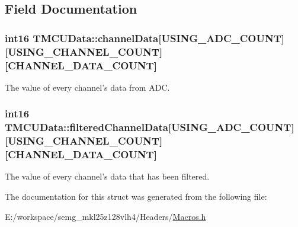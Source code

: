 \subsection{Field Documentation}
\hypertarget{struct_t_m_c_u_data_aef7d4db6ea39953bacce61c20af6a1c5}{
\subsubsection[{channel\-Data}]{\setlength{\rightskip}{0pt plus 5cm}int16 T\-M\-C\-U\-Data\-::channel\-Data\mbox{[}{\bf U\-S\-I\-N\-G\-\_\-\-A\-D\-C\-\_\-\-C\-O\-U\-N\-T}\mbox{]}\mbox{[}{\bf U\-S\-I\-N\-G\-\_\-\-C\-H\-A\-N\-N\-E\-L\-\_\-\-C\-O\-U\-N\-T}\mbox{]}\mbox{[}{\bf C\-H\-A\-N\-N\-E\-L\-\_\-\-D\-A\-T\-A\-\_\-\-C\-O\-U\-N\-T}\mbox{]}}}\label{struct_t_m_c_u_data_aef7d4db6ea39953bacce61c20af6a1c5}
The value of every channel's data from A\-D\-C. \hypertarget{struct_t_m_c_u_data_a1d78433e8986060ae6ca53c035c65619}{
\subsubsection[{filtered\-Channel\-Data}]{\setlength{\rightskip}{0pt plus 5cm}int16 T\-M\-C\-U\-Data\-::filtered\-Channel\-Data\mbox{[}{\bf U\-S\-I\-N\-G\-\_\-\-A\-D\-C\-\_\-\-C\-O\-U\-N\-T}\mbox{]}\mbox{[}{\bf U\-S\-I\-N\-G\-\_\-\-C\-H\-A\-N\-N\-E\-L\-\_\-\-C\-O\-U\-N\-T}\mbox{]}\mbox{[}{\bf C\-H\-A\-N\-N\-E\-L\-\_\-\-D\-A\-T\-A\-\_\-\-C\-O\-U\-N\-T}\mbox{]}}}\label{struct_t_m_c_u_data_a1d78433e8986060ae6ca53c035c65619}
The value of every channel's data that has been filtered. 

The documentation for this struct was generated from the following file\-:\begin{DoxyCompactItemize}
\item 
E\-:/workspace/semg\-\_\-mkl25z128vlh4/\-Headers/\hyperlink{_macros_8h}{Macros.\-h}\end{DoxyCompactItemize}
